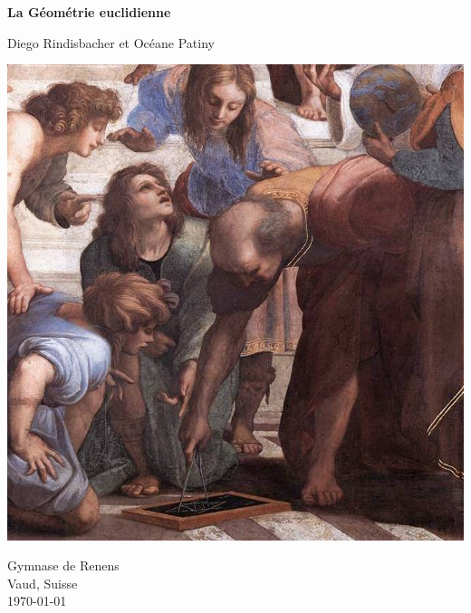 \documentclass[a4paper,12pt]{article}
\begin{document}
\begin{titlepage}
    \begin{center}
        
        \Huge
        \textbf{La Géométrie euclidienne}
        
        \vspace{0.5cm}
        \large
        Diego Rindisbacher et Océane Patiny
        
        
         \vspace{3cm}
          \includegraphics[scale=2.5]{intro/titlepage/Euclide.jpg}
          
         \vspace{0.5cm}
          \small
        Gymnase de Renens\\
        Vaud, Suisse\\
        \today
    \end{center}
\end{titlepage}
\end{document}
